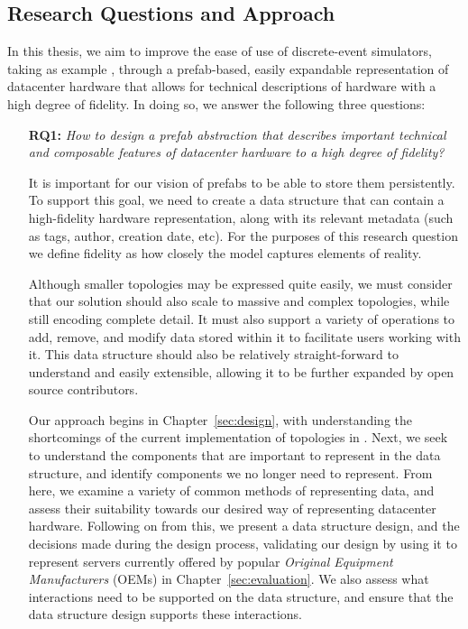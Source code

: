 \documentclass[11pt]{article}
\begin{document}
	\subsection{Research Questions and Approach}
		In this thesis, we aim to improve the ease of use of discrete-event simulators, taking as example \opendc{}, through a prefab-based, easily expandable representation of datacenter hardware that allows for technical descriptions of hardware with a high degree of fidelity. 
		In doing so, we answer the following three questions:
		\begin{itemize}
			\item [\textbf{RQ1:}]\label{itm:one} \textit{How to design a prefab abstraction that describes important technical and composable features of datacenter hardware to a high degree of fidelity?}

			It is important for our vision of prefabs to be able to store them persistently.
			To support this goal, we need to create a data structure that can contain a high-fidelity hardware representation, along with its relevant metadata (such as tags, author, creation date, etc).
			For the purposes of this research question we define fidelity as how closely the model captures elements of reality.

			Although smaller topologies may be expressed quite easily, we must consider that our solution should also scale to massive and complex topologies, while still encoding complete detail.
			It must also support a variety of operations to add, remove, and modify data stored within it to facilitate users working with it.
			This data structure should also be relatively straight-forward to understand and easily extensible, allowing it to be further expanded by open source contributors.

			Our approach begins in Chapter~\ref{sec:design}, with understanding the shortcomings of the current implementation of topologies in \opendc{}.
			Next, we seek to understand the components that are important to represent in the data structure, and identify components we no longer need to represent.
			From here, we examine a variety of common methods of representing data, and assess their suitability towards our desired way of representing datacenter hardware.
			Following on from this, we present a data structure design, and the decisions made during the design process, validating our design by using it to represent servers currently offered by popular \textit{Original Equipment Manufacturers} (OEMs) in Chapter~\ref{sec:evaluation}.
			We also assess what interactions need to be supported on the data structure, and ensure that the data structure design supports these interactions.


\end{itemize}
\end{document}
